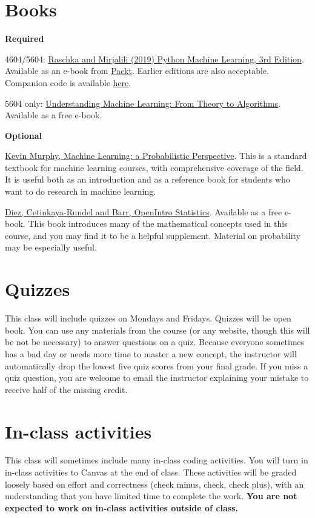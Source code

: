 \documentclass[10pt]{memoir}
\begin{document}
\section{\textbf{Books}}

\textbf{Required}

4604/5604: \href{https://sebastianraschka.com/books.html}{Raschka and Mirjalili (2019) Python Machine Learning, 3rd Edition}. Available as an e-book from \href{https://www.packtpub.com/data/python-machine-learning-third-edition}{Packt}. Earlier editions are also acceptable. Companion code is available \href{https://github.com/rasbt/python-machine-learning-book-3rd-edition}{here}.
 
5604 only: \href{https://www.cs.huji.ac.il/~shais/UnderstandingMachineLearning/copy.html}{Understanding Machine Learning: From Theory to Algorithms}. Available as a free e-book.

\textbf{Optional}

\href{https://www.cs.ubc.ca/~murphyk/MLbook/}{Kevin Murphy, Machine Learning: a Probabilistic Perspective}. This is a standard textbook for machine learning courses, with comprehensive coverage of the field. It is useful both as an introduction and as a reference book for students who want to do research in machine learning.

\href{https://www.abehandler.com/resources/openintro-statistics.pdf}{Diez, Cetinkaya-Rundel and Barr, OpenIntro Statistics}. Available as a free e-book. This book introduces many of the mathematical concepts used in this course, and you may find it to be a helpful supplement. Material on probability may be especially useful.

\section{\textbf{Quizzes}}

This class will include quizzes on Mondays and Fridays.
Quizzes will be open book.
You can use any materials from the course (or any website, though this will be not be necessary) to answer questions on a quiz. 
Because everyone sometimes has a bad day or needs more time to master a new concept, the instructor will automatically drop the lowest five quiz scores from your final grade.
If you miss a quiz question, you are welcome to email the instructor explaining your mistake to receive half of the missing credit.

\section{\textbf{In-class activities}}
This class will sometimes include many in-class coding activities.
You will turn in in-class activities to Canvas at the end of class.
These activities will be graded loosely based on effort and correctness (check minus, check, check plus), with an understanding that you have limited time to complete the work.
\textbf{You are not expected to work on in-class activities outside of class.}
\end{document}
